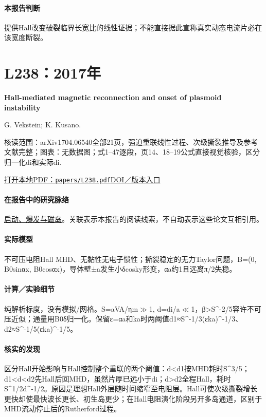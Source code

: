\documentclass[UTF8,a4paper,11pt,openany,fontset=fandol]{ctexbook}
\begin{document}
\paragraph{本报告判断}提供Hall改变破裂临界长宽比的线性证据；不能直接据此宣称真实动态电流片必在该宽度断裂。

\section{L238：2017年}\label{paper:L238}

\textbf{Hall-mediated magnetic reconnection and onset of plasmoid instability}\citep{L238}\

G. Vekstein;  K. Kusano.

\textsf{核读范围：}arXiv1704.06540全部21页，强迫重联线性过程、次级撕裂推导及参考文献完整；\textsf{图表：}无数据图；式1–47逐段，页14、18–19公式直接视觉核验，区分归一化di和实际di.

\href{run:../papers/L238.pdf}{打开本地PDF：\texttt{papers/L238.pdf}}\quad\href{https://arxiv.org/abs/1704.06540}{DOI／版本入口}

\paragraph{在报告中的研究脉络}\hyperref[story:onset]{启动、爆发与磁岛}。关联表示本报告的阅读线索，不自动表示这些论文互相引用。

\paragraph{实际模型}不可压电阻Hall MHD、无黏性无电子惯性；撕裂稳定的无力Taylor问题，B=(0, B0sinαx, B0cosαx)，导体壁±a发生小δcosky形变，αa约1且远离π/2失稳。

\paragraph{计算／实验细节}纯解析标度，没有模拟/网格。S=aVA/ηm\ensuremath{\gg}1, d=di/a\ensuremath{\ll}1，β>S\textasciicircum{}-2/5容许不可压近似；通量用B0δ归一化。保留ε=αa和ka时两阈值d1≈S\textasciicircum{}-1/3(εka)\textasciicircum{}-1/3、d2≈S\textasciicircum{}-1/5(εka)\textasciicircum{}-1/5。

\paragraph{核实的发现}区分Hall开始影响与Hall控制整个重联的两个阈值：d<d1按MHD耗时S\textasciicircum{}3/5；d1<d<d2先Hall后回MHD，虽然片厚已远小于di；d>d2全程Hall，耗时S\textasciicircum{}1/2d\textasciicircum{}-1/2。原因是理想Hall外层随时间缩窄至电阻层。Hall可使次级撕裂增长更快却使最快波长更长、初生岛更少；在Hall电阻演化阶段另开多岛通道，区别于MHD流动停止后的Rutherford过程。
\end{document}

